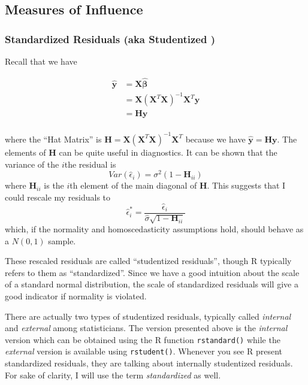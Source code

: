 \documentclass[]{book}
\theoremstyle{definition}
\theoremstyle{definition}
\theoremstyle{remark}
\begin{document}
\subsection{Measures of Influence}\label{measures-of-influence}

\subsubsection{Standardized Residuals (aka Studentized
)}\label{standardized-residuals-aka-studentized}

Recall that we have

\[\begin{aligned}\hat{\boldsymbol{y}}   
  &=    \boldsymbol{X}\hat{\boldsymbol{\beta}}\\
    &=  \boldsymbol{X}\left(\boldsymbol{X}^{T}\boldsymbol{X}\right)^{-1}\boldsymbol{X}^{T}\boldsymbol{y}\\
    &=  \boldsymbol{H}\boldsymbol{y}\\
\end{aligned}\]

where the ``Hat Matrix'' is
\(\boldsymbol{H}=\boldsymbol{X}\left(\boldsymbol{X}^{T}\boldsymbol{X}\right)^{-1}\boldsymbol{X}^{T}\)
because we have \(\hat{\boldsymbol{y}}=\boldsymbol{H}\boldsymbol{y}\).
The elements of \(\boldsymbol{H}\) can be quite useful in diagnostics.
It can be shown that the variance of the \(i\)the residual is
\[Var\left(\hat{\epsilon}_{i}\right)=\sigma^{2}\left(1-\boldsymbol{H}_{ii}\right)\]
where \(\boldsymbol{H}_{ii}\) is the \(i\)th element of the main
diagonal of \(\boldsymbol{H}\). This suggests that I could rescale my
residuals to
\[\hat{\epsilon}_{i}^{*}=\frac{\hat{\epsilon}_{i}}{\hat{\sigma}\sqrt{1-\boldsymbol{H}_{ii}}}\]
which, if the normality and homoscedasticity assumptions hold, should
behave as a \(N\left(0,1\right)\) sample.

These rescaled residuals are called ``studentized residuals'', though R
typically refers to them as ``standardized''. Since we have a good
intuition about the scale of a standard normal distribution, the scale
of standardized residuals will give a good indicator if normality is
violated.

There are actually two types of studentized residuals, typically called
\emph{internal} and \emph{external} among statisticians. The version
presented above is the \emph{internal} version which can be obtained
using the R function \texttt{rstandard()} while the \emph{external}
version is available using \texttt{rstudent()}. Whenever you see R
present standardized residuals, they are talking about internally
studentized residuals. For sake of clarity, I will use the term
\emph{standardized} as well.
\end{document}

